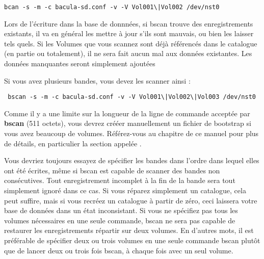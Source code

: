 \footnotesize
\begin{verbatim}
bcan -s -m -c bacula-sd.conf -v -V Vol001\|Vol002 /dev/nst0
\end{verbatim}
\normalsize

Lors de l'écriture dans la base de donnnées, si bscan trouve des enregistrements
existants, il va en général les mettre à jour s'ils sont mauvais, ou bien les
laisser tels quels. Si les Volumes que vous scannez sont déjà référencés dans
le catalogue (en partie ou totalement), il ne sera fait aucun mal aux données
existantes. Les données manquantes seront simplement ajoutées

Si vous avez plusieurs bandes, vous devez les scanner ainsi :

\footnotesize
\begin{verbatim}
 bscan -s -m -c bacula-sd.conf -v -V Vol001\|Vol002\|Vol003 /dev/nst0
\end{verbatim}
\normalsize

Comme il y a une limite sur la longueur de la ligne de commande acceptée par
{\bf bscan} (511 octets), vous devrez crééer manuellement un fichier de 
bootstrap si vous avez beaucoup de volumes.  Référez-vous au chapitre
 de ce manuel pour plus de détails, en
particulier la section appelée .

Vous devriez toujours essayez de spécifier les bandes dans l'ordre dans lequel
elles ont été écrites, même si bscan est capable de scanner des bandes non 
consécutives. Tout enregistrement incomplet à la fin de la bande sera tout
simplement ignoré dans ce cas. Si vous réparez simplement un catalogue, cela
peut suffire, mais si vous recréez un catalogue à partir de zéro, ceci laissera
votre base de données dans un état inconsistant. Si vous ne spécifiez pas tous
les volumes nécessaires en une seule commande, bscan ne sera pas capable de 
restaurer les enregistrements répartir sur deux volumes. En d'autres mots, il
est préférable de spécifier deux ou trois volumes en une seule commande bscan
plutôt que de lancer deux ou trois fois bscan, à chaque fois avec un seul
volume.


